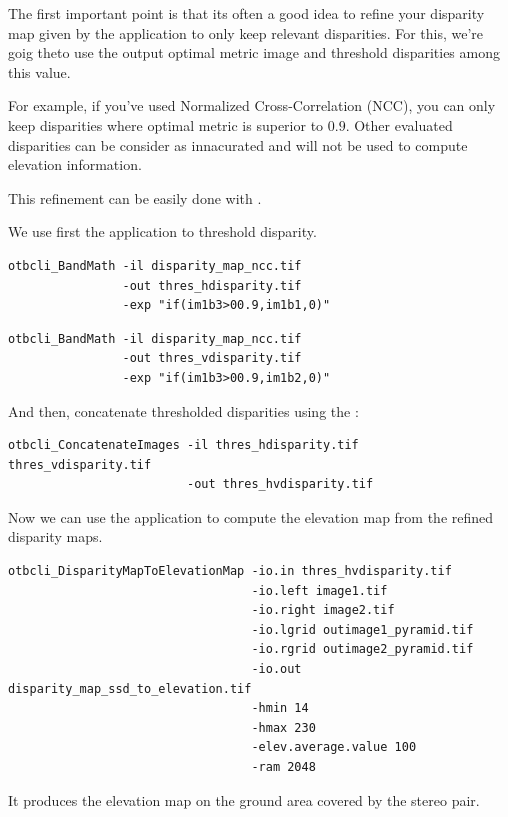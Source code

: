 The first important point is that its often a good idea to refine your disparity
map given by the  application to only keep relevant
disparities. For this, we're goig theto use the output optimal metric image and
threshold disparities among this value.

For example, if you've used Normalized Cross-Correlation (NCC), you can only
keep disparities where optimal metric is superior to $0.9$. Other evaluated
disparities can be consider as innacurated and will not be used to compute
elevation information.

This refinement can be easily done with \app.

We use first the  application to threshold disparity.

\begin{verbatim}
otbcli_BandMath -il disparity_map_ncc.tif
                -out thres_hdisparity.tif
                -exp "if(im1b3>00.9,im1b1,0)"
\end{verbatim}

\begin{verbatim}
otbcli_BandMath -il disparity_map_ncc.tif
                -out thres_vdisparity.tif
                -exp "if(im1b3>00.9,im1b2,0)"
\end{verbatim}

And then, concatenate thresholded disparities using the :

\begin{verbatim}
otbcli_ConcatenateImages -il thres_hdisparity.tif  thres_vdisparity.tif
                         -out thres_hvdisparity.tif
\end{verbatim}

Now we can use the  application to
compute the elevation map from the refined disparity maps.

\begin{verbatim}
otbcli_DisparityMapToElevationMap -io.in thres_hvdisparity.tif
                                  -io.left image1.tif
                                  -io.right image2.tif
                                  -io.lgrid outimage1_pyramid.tif
                                  -io.rgrid outimage2_pyramid.tif
                                  -io.out disparity_map_ssd_to_elevation.tif
                                  -hmin 14
                                  -hmax 230
                                  -elev.average.value 100
                                  -ram 2048
\end{verbatim}

It produces the elevation map on the ground area covered by the stereo pair.

